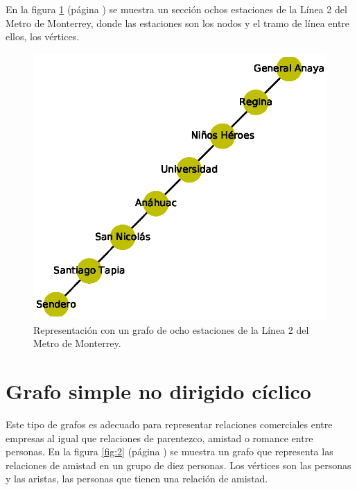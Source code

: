 \documentclass{article}
\begin{document}
En la figura \ref{fig:1} (página \pageref{fig:1}) se muestra un sección ochos estaciones de la Línea 2 del Metro de Monterrey, donde las estaciones son los nodos y el tramo de línea entre ellos, los vértices. 




\begin{figure}
  \includegraphics[width=.8\columnwidth]{1.eps}
   \vspace*{-8mm}
  \caption{Representación con un grafo de ocho estaciones de la Línea 2 del Metro de Monterrey.}
 
  \label{fig:1}
\end{figure}

\section{Grafo simple no dirigido cíclico}

Este tipo de grafos es adecuado para representar relaciones comerciales entre empresas al igual que relaciones de parentezco, amistad o romance entre personas.
En la figura \ref{fig:2} (página \pageref{fig:2}) se muestra un grafo que representa las relaciones de amistad en un grupo de diez personas. Los vértices son las personas y las aristas, las personas que tienen una relación de amistad.
 

\end{document}
